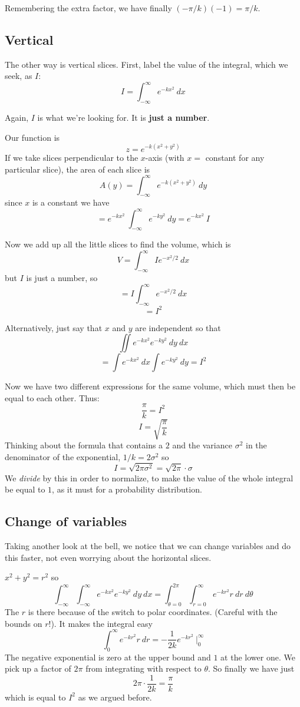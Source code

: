 \documentclass[11pt, oneside]{article}
\begin{document}
Remembering the extra factor, we have finally $(-\pi/k)(-1) = \pi/k$.

\subsection*{Vertical}
The other way is vertical slices.  First, label the value of the integral, which we seek, as $I$:
\[ I = \int_{-\infty}^{\infty} e^{-kx^2} \ dx \]

Again, $I$ is what we're looking for.  It is \textbf{just a number}.  

Our function is
\[ z = e^{-k(x^2 + y^2)} \]
If we take slices perpendicular to the $x$-axis (with $x =$ constant for any particular slice), the area of each slice is
\[ A(y) = \int_{-\infty}^{\infty} e^{-k(x^2 + y^2)} \ dy \]
since  $x$ is a constant we have
\[ = e^{-kx^2} \ \int_{-\infty}^{\infty} e^{-ky^2} \ dy = e^{-kx^2} \ I \]

Now we add up all the little slices to find the volume, which is
\[  V =  \int_{-\infty}^{\infty} I e^{-x^2/2} \ dx \]
but $I$ is just a number, so
\[  =  I \int_{-\infty}^{\infty} e^{-x^2/2} \ dx \]
\[ = I^2 \]

Alternatively, just say that $x$ and $y$ are independent so that
\[ \iint e^{-kx^2} e^{-ky^2} \ dy \ dx \]
\[ = \int e^{-kx^2} \ dx \int e^{-ky^2} \ dy = I^2 \]

Now we have two different expressions for the same volume, which must then be equal to each other.  Thus:
\[ \frac{\pi}{k} = I^2 \]
\[ I = \sqrt{\frac{\pi}{k}} \]
Thinking about the formula that contains a $2$ and the variance $\sigma^2$ in the denominator of the exponential, $1/k = 2 \sigma^2$ so
\[ I = \sqrt{2 \pi \sigma^2 }   = \sqrt{2 \pi } \cdot \sigma \]
We \emph{divide} by this in order to normalize, to make the value of the whole integral be equal to $1$, as it must for a probability distribution.

\subsection*{Change of variables}
Taking another look at the bell, we notice that we can change variables and do this faster, not even worrying about the horizontal slices.

$x^2 + y^2 = r^2$ so
\[ \int_{-\infty}^{\infty} \int_{-\infty}^{\infty} e^{-kx^2} e^{-ky^2} \ dy \ dx = \int_{\theta = 0}^{2 \pi} \int_{r=0}^{\infty} e^{-kr^2} r \ dr \ d \theta \]
The $r$ is there because of the switch to polar coordinates.  (Careful with the bounds on $r$!).  It makes the integral easy
\[  \int_{0}^{\infty} e^{-kr^2} r \ dr  = -\frac{1}{2k} e^{-kr^2} \ \bigg |_0^{\infty} \]
The negative exponential is zero at the upper bound and $1$ at the lower one.  We pick up a factor of $2 \pi$ from integrating with respect to $\theta$.  So finally we have just
\[ 2 \pi \cdot \frac{1}{2k} = \frac{\pi}{k} \]
which is equal to $I^2$ as we argued before.
\end{document}
